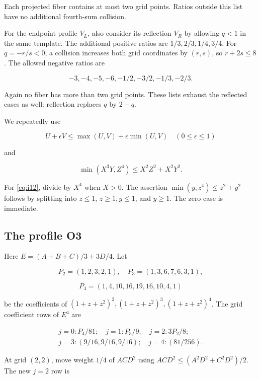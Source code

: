Each projected fiber contains at most two grid points. Ratios outside this
list have no additional fourth-sum collision.

For the endpoint profile \(V_L\), also consider its reflection \(V_R\) by
allowing \(q<1\) in the same template. The additional positive ratios are
\(1/3,2/3,1/4,3/4\). For \(q=-r/s<0\), a collision increases both grid
coordinates by \((r,s)\), so \(r+2s\le8\). The allowed negative ratios are

\begin{equation}\label{eq:i10}
-3,-4,-5,-6,-1/2,-3/2,-1/3,-2/3.
\end{equation}

Again no fiber has more than two grid points. These lists exhaust the
reflected cases as well: reflection replaces \(q\) by \(2-q\).

We repeatedly use

\begin{equation}\label{eq:i11}
U+\epsilon V\le\max(U,V)+\epsilon\min(U,V)\quad(0\le\epsilon\le1)
\end{equation}

and

\begin{equation}\label{eq:i12}
\min(X^3Y,Z^4)\le X^2Z^2+X^2Y^2.
\end{equation}

For \eqref{eq:i12}, divide by \(X^4\) when \(X>0\). The assertion
\(\min(y,z^4)\le z^2+y^2\) follows by splitting into \(z\le1\),
\(z\ge1,y\le1\), and \(y\ge1\). The zero case is immediate.

\subsection{The profile O3}\label{sec:i-o3}

Here \(E=(A+B+C)/3+3D/4\). Let

\[
P_2=(1,2,3,2,1),\quad P_3=(1,3,6,7,6,3,1),
\]

\[
P_4=(1,4,10,16,19,16,10,4,1)
\]

be the coefficients of \((1+z+z^2)^2,(1+z+z^2)^3,(1+z+z^2)^4\).
The grid coefficient rows of \(E^4\) are

\[
\begin{gathered}
j=0:P_4/81;\quad j=1:P_3/9;\quad j=2:3P_2/8;\\
j=3:(9/16,9/16,9/16);\quad j=4:(81/256).
\end{gathered}
\]

At grid \((2,2)\), move weight \(1/4\) of \(ACD^2\) using
\(ACD^2\le(A^2D^2+C^2D^2)/2\). The new \(j=2\) row is

